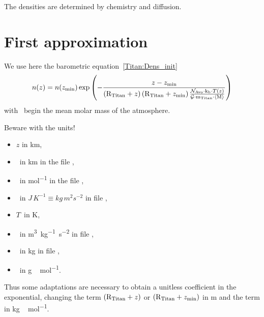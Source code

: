The densities are determined by chemistry and diffusion.

\section{First approximation}

We use here the barometric equation~\ref{Titan:Dens_init}
\begin{equation}
n(z) = n(z_\text{min}) \exp\left(-\frac{z - z_\text{min}}
                                        {\left(\text{R}_\text{Titan} + z\right)
                                         \left(\text{R}_\text{Titan} + z_\text{min}\right)
                                         \frac{\mathcal{N}_\text{Avo}\cdot\text{k}_\text{b}\cdot T(z)}{\mathcal{G}\cdot\text{m}_\text{Titan}\cdot\langle\text{M}\rangle}
                                        }
                            \right)
\label{Titan:Dens_init}
\end{equation}
with \mean{\Mm}\ begin the mean molar mass of the atmosphere.

\begin{remark}
Beware with the units!
\begin{itemize}
\item $z$         in \unit{km},
\item \RTitan\    in \unit{km} in the file \planetConstantsHeader,
\item \Nav\       in \unit{mol^{-1}} in the file \antiochPhysicalConstantsHeader,
\item \kb\        in $\unit{J\,K^{-1}} \equiv \unit{kg\,m^2s^{-2}}$ in file \planetConstantsHeader,
\item $T$\        in \unit{K},
\item \Guni\      in \unit{m^3kg^{-1}s^{-2}} in file \planetConstantsHeader,
\item \MTitan\    in \unit{kg} in file \planetConstantsHeader,
\item \mean{\Mm}\ in \unit{g\,mol^{-1}}.
\end{itemize}
Thus some adaptations are necessary to obtain a unitless coefficient in the exponential,
changing the term $\left(\text{R}_\text{Titan} + z\right)$ or $\left(\text{R}_\text{Titan} + z_\text{min}\right)$ in \unit{m}
and the term \mean{\Mm} in \unit{kg\,mol^{-1}}.
\end{remark}
